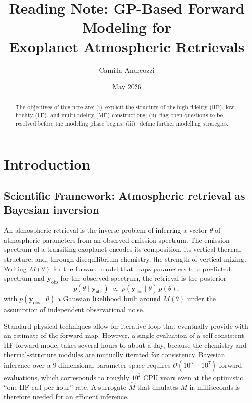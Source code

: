 \documentclass[11pt,a4paper]{article}
\title{Reading Note: GP-Based Forward Modeling for\\Exoplanet Atmospheric Retrievals}
\author{Camilla Andreozzi}
\date{May 2026}
\newcommand{\researchq}[1]{%
  \par\smallskip\noindent
  \textbf{\textcolor{blue}{Research question.}}\,\textit{#1}\par\smallskip}
\newcommand{\thref}[1]{{\color{teal}\textit{Thesis: #1}}}
\newcommand{\litref}[1]{{\color{violet}\textit{See: #1}}}
\newcommand{\yv}{\bm{y}}
\begin{document}
\maketitle

\begin{abstract}
The objectives of this note are: (i)~explicit the structure of the high-fidelity (HF),
low-fidelity (LF), and multi-fidelity (MF) constructions; (ii)~flag open
questions to be resolved before the modeling phase begins; (iii)~ define further modelling strategies.
\end{abstract}

\tableofcontents
\bigskip

\section{Introduction}

\subsection{Scientific Framework: Atmospheric retrieval as Bayesian inversion}

An atmospheric retrieval is the inverse problem of inferring a vector $\theta$ of atmospheric parameters from an observed emission spectrum. The emission spectrum of a transiting exoplanet encodes its composition, its vertical thermal structure, and, through disequilibrium chemistry, the strength of vertical mixing. Writing $M(\theta)$ for the forward model that maps parameters to a predicted spectrum and $\yv_{\mathrm{obs}}$ for the
observed spectrum, the retrieval is the posterior
\[
p( \theta \mid \yv_{\mathrm{obs}}) \;\propto\;
p(\yv_{\mathrm{obs}}\mid\theta)\,p(\theta),
\]
with $p(\yv_{\mathrm{obs}}\mid\theta)$ a Gaussian likelihood built around $M(\theta)$ under the assumption of independent observational noise.

Standard physical techniques allow for iterative loop that eventually provide with an estimate of the forward map. However, a single evaluation of a self-consistent HF forward model takes several hours to about a day, because the chemistry and thermal-structure modules are mutually iterated for consistency.
Bayesian inference over a $9$-dimensional parameter space requires $\mathcal{O}(10^{5}\!-\!10^{7})$ forward evaluations, which corresponds to roughly $10^{2}$ CPU years even at the optimistic ``one HF call per hour'' rate. A surrogate $\hat M$ that emulates $M$ in milliseconds is therefore needed for an efficient inference.\\
\end{document}
